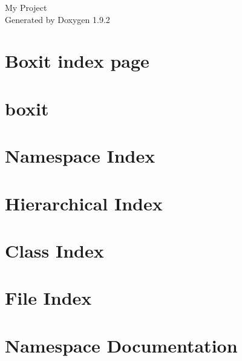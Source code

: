 \documentclass[twoside]{book}
\newcommand{\+}{\discretionary{\mbox{\scriptsize$\hookleftarrow$}}{}{}}
\newcommand{\clearemptydoublepage}{%
    \newpage{\pagestyle{empty}\cleardoublepage}%
  }
\begin{document}
  \raggedbottom
    \hypersetup{pageanchor=false,
                bookmarksnumbered=true,
                pdfencoding=unicode
               }
  \begin{titlepage}
  \vspace*{7cm}
  \begin{center}%
  {\Large My Project}\\
  \vspace*{1cm}
  {\large Generated by Doxygen 1.9.2}\\
  \end{center}
  \end{titlepage}
  \clearemptydoublepage
  \tableofcontents
  \clearemptydoublepage
  \hypersetup{pageanchor=true}
\chapter{Box\textquotesingle{}it index page}
\label{index}\hypertarget{index}{}
\chapter{box\textquotesingle{}it}
\label{md__r_e_a_d_m_e}

\chapter{Namespace Index}

\chapter{Hierarchical Index}

\chapter{Class Index}

\chapter{File Index}

\chapter{Namespace Documentation}




\end{document}
